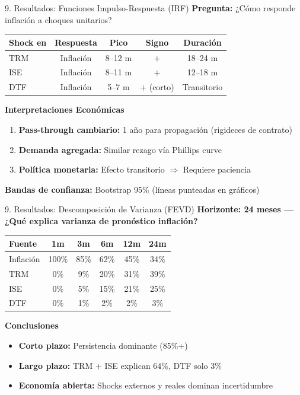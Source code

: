 \documentclass[spanish, 11pt]{beamer}
\begin{document}
\begin{frame}{9. Resultados: Funciones Impulso-Respuesta (IRF)}
\textbf{Pregunta:} ¿Cómo responde inflación a choques unitarios?

\vspace{0.2cm}
\begin{tabular}{lcccc}
\toprule
\textbf{Shock en} & \textbf{Respuesta} & \textbf{Pico} & \textbf{Signo} & \textbf{Duración} \\
\midrule
TRM & Inflación & 8--12 m & $+$ & 18--24 m \\
ISE & Inflación & 8--11 m & $+$ & 12--18 m \\
DTF & Inflación & 5--7 m & $+$ (corto) & Transitorio \\
\bottomrule
\end{tabular}

\vspace{0.3cm}
\textbf{Interpretaciones Económicas}
\begin{enumerate}
  \item \textbf{Pass-through cambiario:} 1 año para propagación (rigideces de contrato)
  \item \textbf{Demanda agregada:} Similar rezago vía Phillips curve
  \item \textbf{Política monetaria:} Efecto transitorio $\Rightarrow$ Requiere paciencia
\end{enumerate}

\vspace{0.2cm}
\textbf{Bandas de confianza:} Bootstrap 95\% (líneas punteadas en gráficos)
\end{frame}

\begin{frame}{9. Resultados: Descomposición de Varianza (FEVD)}
\textbf{Horizonte: 24 meses — ¿Qué explica varianza de pronóstico inflación?}

\vspace{0.2cm}
\centering
\begin{tabular}{lccccc}
\toprule
\textbf{Fuente} & \textbf{1m} & \textbf{3m} & \textbf{6m} & \textbf{12m} & \textbf{24m} \\
\midrule
Inflación & 100\% & 85\% & 62\% & 45\% & 34\% \\
TRM & 0\% & 9\% & 20\% & 31\% & 39\% \\
ISE & 0\% & 5\% & 15\% & 21\% & 25\% \\
DTF & 0\% & 1\% & 2\% & 2\% & 3\% \\
\bottomrule
\end{tabular}

\vspace{0.3cm}
\textbf{Conclusiones}
\begin{itemize}
  \item \textbf{Corto plazo:} Persistencia dominante (85\%+)
  \item \textbf{Largo plazo:} TRM + ISE explican 64\%, DTF solo 3\%
  \item \textbf{Economía abierta:} Shocks externos y reales dominan incertidumbre
\end{itemize}
\end{frame}
\end{document}
